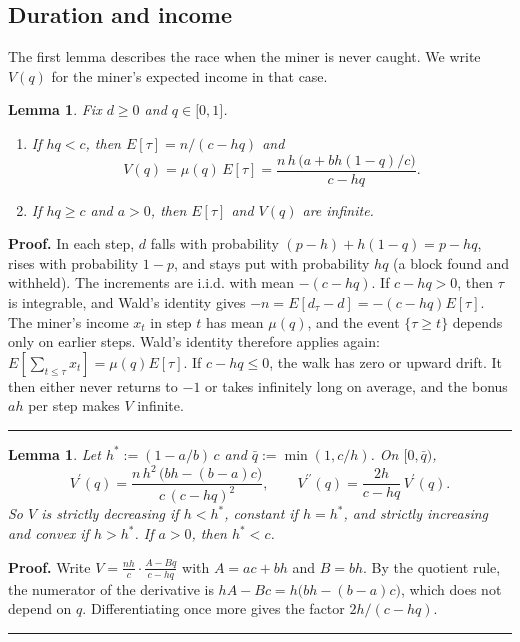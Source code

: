 \documentclass{article}%
\newtheorem{lemma}[theorem]{Lemma}
\newenvironment{proof}[1][Proof]{\noindent\textbf{#1.} }{\ \rule{0.5em}{0.5em}}
\begin{document}
\subsection{Duration and income}

The first lemma describes the race when the miner is never caught. We write
$V(q)$ for the miner's expected income in that case.

\begin{lemma}
\label{lem:lazy}Fix $d\geq0$ and $q\in\lbrack0,1]$.

\begin{enumerate}
\item[(i)] If $hq<c$, then $E[\tau]=n/(c-hq)$ and%
\begin{equation}
V(q)=\mu(q)\,E[\tau]=\frac{n\,h\,\bigl(a+bh(1-q)/c\bigr)}{c-hq}.
\label{Vwithhold}%
\end{equation}

\item[(ii)] If $hq\geq c$ and $a>0$, then $E[\tau]$ and $V(q)$ are infinite.
\end{enumerate}
\end{lemma}

\begin{proof}
In each step, $d$ falls with probability $(p-h)+h(1-q)=p-hq$, rises with
probability $1-p$, and stays put with probability $hq$ (a block found and
withheld). The increments are i.i.d. with mean $-(c-hq)$. If $c-hq>0$, then
$\tau$ is integrable, and Wald's identity gives $-n=E[d_{\tau}-d]=-(c-hq)E[\tau]$.
The miner's income $x_{t}$ in step $t$ has mean $\mu(q)$, and the event
$\{\tau\geq t\}$ depends only on earlier steps. Wald's identity therefore
applies again: $E[\sum_{t\leq\tau}x_{t}]=\mu(q)E[\tau]$. If $c-hq\leq0$, the
walk has zero or upward drift. It then either never returns to $-1$ or takes
infinitely long on average, and the bonus $ah$ per step makes $V$ infinite.
\end{proof}

\begin{lemma}
\label{lem:Vshape}Let $h^{\ast}:=(1-a/b)\,c$ and $\bar{q}:=\min(1,c/h)$. On
$[0,\bar{q})$,%
\[
V^{\prime}(q)=\frac{n\,h^{2}\,\bigl(bh-(b-a)c\bigr)}{c\,(c-hq)^{2}%
},\qquad V^{\prime\prime}(q)=\frac{2h}{c-hq}\,V^{\prime}(q).
\]
So $V$ is strictly decreasing if $h<h^{\ast}$, constant if $h=h^{\ast}$, and
strictly increasing and convex if $h>h^{\ast}$. If $a>0$, then $h^{\ast}<c$.
\end{lemma}

\begin{proof}
Write $V=\frac{nh}{c}\cdot\frac{A-Bq}{c-hq}$ with $A=ac+bh$ and $B=bh$. By the
quotient rule, the numerator of the derivative is $hA-Bc=h\bigl(bh-(b-a)c\bigr)$,
which does not depend on $q$. Differentiating once more gives the factor
$2h/(c-hq)$.
\end{proof}
\end{document}

